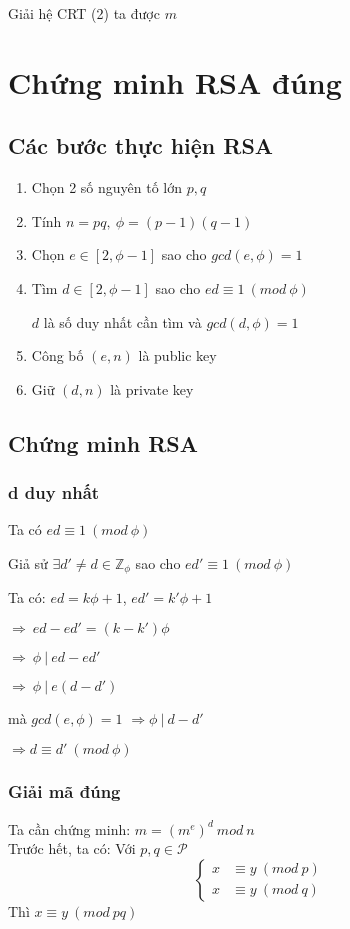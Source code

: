 \documentclass[12pt]{article}
\begin{document}
Giải hệ CRT (2) ta được $m$
\section{Chứng minh RSA đúng}
\subsection{Các bước thực hiện RSA}

\begin{enumerate}[ {(}1{)} ]
        \item Chọn 2 số nguyên tố lớn $p,q$
        \item Tính $n=pq,\ \phi= (p-1)(q-1)$
        \item Chọn $e\in[2, \phi - 1]$ sao cho $gcd(e, \phi) = 1$
        \item Tìm $d \in [2, \phi - 1]$ sao cho $ed \equiv 1\ (mod\ \phi)$

        $d$ là số duy nhất cần tìm và $gcd(d,\phi)=1$
        \item Công bố $(e, n)$ là public key
        \item Giữ $(d, n)$ là private key
\end{enumerate}

\subsection{Chứng minh RSA}
\subsubsection{d duy nhất}
Ta có $ed \equiv 1\ (mod\ \phi)$

Giả sử $\exists d' \neq d \in \mathbb{Z}_{\phi}$ sao cho $ed' \equiv 1\ (mod\ \phi)$

Ta có: 
$ed = k\phi + 1$, $ed'=k'\phi+1$

$\Rightarrow\ ed -ed' = (k-k')\phi$

$\Rightarrow\ \phi\ |\ ed - ed'$

$\Rightarrow\ \phi\ |\ e(d - d')$

mà $gcd(e,\phi) = 1$ $\Rightarrow \phi\ |\ d - d'$

$\Rightarrow d \equiv d'\ (mod\ \phi)$

\subsubsection{Giải mã đúng }
Ta cần chứng minh: $m=(m^e)^d\ mod\ n$\\
Trước hết, ta có:
Với $p,q \in \mathcal{P}$
\begin{equation*}
\begin{cases}
x &{} \equiv y\ (mod\ p)\\
x &{} \equiv y\ (mod\ q)
\end{cases}
\end{equation*}
Thì $x \equiv y\ (mod\ pq)$
\end{document}
